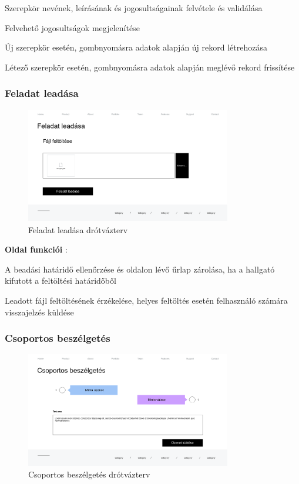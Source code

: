 \begin{compactitem}
	\item  Szerepkör nevének, leírásának és jogosultságainak felvétele és validálása
         \item Felvehető jogosultságok megjelenítése
        \item Új szerepkör esetén, gombnyomásra adatok alapján új rekord létrehozása
        \item Létező szerepkör esetén, gombnyomásra adatok alapján meglévő rekord frissítése
 \end{compactitem}

\subsubsection{Feladat leadása}

\begin{figure}[H]
	\centering
	\includegraphics[width=0.8\textwidth]{images/feladat_leadasa_wire.png}
	\caption{Feladat leadása drótvázterv}
\end{figure}

\textbf{Oldal funkciói} :

\begin{compactitem}
	\item A beadási határidő ellenőrzése és oldalon lévő űrlap zárolása, ha a hallgató kifutott a feltöltési határidőből
         \item Leadott fájl feltöltésének érzékelése, helyes feltöltés esetén felhasználó számára visszajelzés küldése
 \end{compactitem}

\subsubsection{Csoportos beszélgetés}

\begin{figure}[H]
	\centering
	\includegraphics[width=0.8\textwidth]{images/csoportos_beszelgetes_wire.png}
	\caption{Csoportos beszélgetés drótvázterv}
\end{figure}

